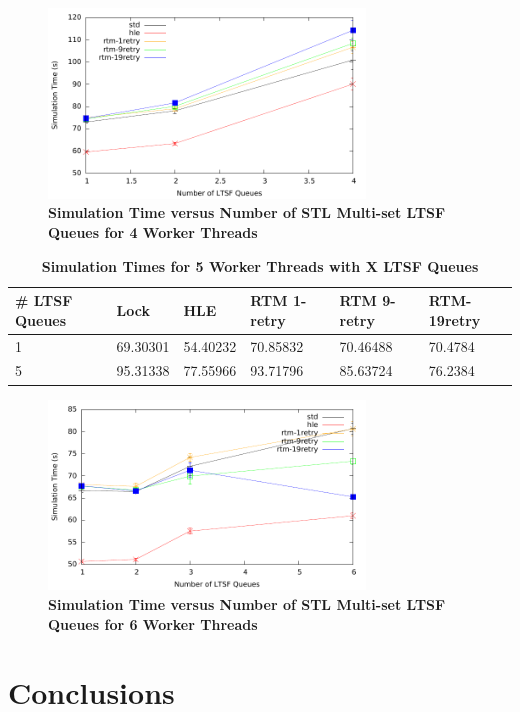 \documentclass[11pt]{book}
\begin{document}
\begin{figure}[H]
    \centering
    \graphicspath{ {./figures/} }
    \includegraphics[width=0.75\textwidth,keepaspectratio]{xThrMig-hugeEpidemicSim-timeVSschedQs-multiset-4thread}
    \caption{\textbf{Simulation Time versus Number of STL Multi-set LTSF Queues
    for 4 Worker Threads}}
    \label{fig:xThrMig_timeVSschq_4threads}
\end{figure}

\begin{table}[H]
    \centering
    \begin{tabular}{l|p{2cm}|p{2cm}|p{2cm}|p{2cm}|p{2cm}}
        \textbf{\# LTSF Queues}&Lock &HLE &RTM 1-retry &RTM 9-retry &RTM-19retry \\
        \hline
        \midrule
            1 &69.30301  &54.40232 &70.85832  &70.46488 &70.4784 \\ 
            5 &95.31338  &77.55966 &93.71796  &85.63724 &76.2384 \\
    \end{tabular}
    \caption{\textbf{Simulation Times for 5 Worker Threads with X LTSF Queues}}
    \label{tab:xThrMig_5threadsXschq}
\end{table}

\begin{figure}[H]
    \centering
    \graphicspath{ {./figures/} }
    \includegraphics[width=0.75\textwidth,keepaspectratio]{xThrMig-hugeEpidemicSim-timeVSschedQs-multiset-6thread}
    \caption{\textbf{Simulation Time versus Number of STL Multi-set LTSF Queues
    for 6 Worker Threads}}
    \label{fig:xThrMig_timeVSschq_6threads}
\end{figure}

\chapter{Conclusions}





\newpage


\end{document}
